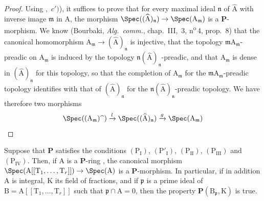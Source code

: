 \begin{proof}
Using ,~$c')$), it suffices to prove that for every maximal ideal $\mathfrak{n}$ of $\widehat{\mathrm{A}}$ with inverse image $\mathfrak{m}$ in $\mathrm{A}$, the morphism $\Spec((\widehat{\mathrm{A}})_\mathfrak{n})\to\Spec(\mathrm{A}_\mathfrak{m})$ is a $\boldsymbol{P}$-morphism.
We know (Bourbaki, \emph{Alg.\ comm.}, chap.~III, \textsection\,3, n\textsuperscript{o}\,4, prop.~8) that the canonical homomorphism $\mathrm{A}_\mathfrak{m}\to(\widehat{\mathrm{A}})_\mathfrak{n}$ is injective, that the topology $\mathfrak{m}\mathrm{A}_\mathfrak{m}$-preadic on $\mathrm{A}_\mathfrak{m}$ is induced by the topology $\mathfrak{n}(\widehat{\mathrm{A}})_\mathfrak{n}$-preadic, and that $\mathrm{A}_\mathfrak{m}$ is dense in $(\widehat{\mathrm{A}})_\mathfrak{n}$ for this topology, so that the completion of $\mathrm{A}_\mathfrak{m}$ for the $\mathfrak{m}\mathrm{A}_\mathfrak{m}$-preadic topology identifies with that of $(\widehat{\mathrm{A}})_\mathfrak{n}$ for the $\mathfrak{n}(\widehat{\mathrm{A}})_\mathfrak{n}$-preadic topology.
We have therefore two morphisms
\[
  \Spec((\mathrm{A}_\mathfrak{m})\widehat{\phantom{x}})\xrightarrow{l}\Spec((\widehat{\mathrm{A}})_\mathfrak{n})\xrightarrow{g}\Spec(\mathrm{A}_\mathfrak{m})
\]
\end{proof}

\begin{corollary}[7.4.7]
\label{IV.7.4.7}
Suppose that $\boldsymbol{P}$ satisfies the conditions $(\mathrm{P_I})$, $(\mathrm{P}'_\mathrm{I})$, $(\mathrm{P_{II}})$, $(\mathrm{P_{III}})$ and $(\mathrm{P_{IV}})$.
Then, if $\mathrm{A}$ is a $\boldsymbol{P}$-ring , the canonical morphism $\Spec(\mathrm{A}[[\mathrm{T}_1,\ldots,\mathrm{T}_r]])\to\Spec(\mathrm{A})$ is a $\boldsymbol{P}$-morphism.
In particular, if in addition $\mathrm{A}$ is integral, $\mathrm{K}$ its field of fractions, and if $\mathfrak{p}$ is a prime ideal of $\mathrm{B}=\mathrm{A}[[\mathrm{T}_1,\ldots,\mathrm{T}_r]]$ such that $\mathfrak{p}\cap\mathrm{A}=0$, then the property $\boldsymbol{P}(\mathrm{B}_\mathfrak{p},\mathrm{K})$ is true.
\end{corollary}

